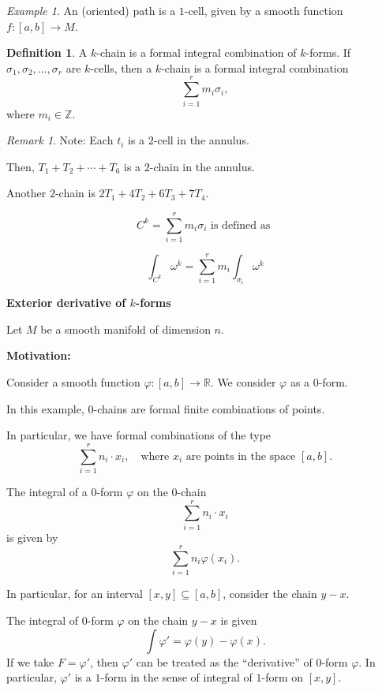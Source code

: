 \documentclass[11pt]{article}
\theoremstyle{definition}
\newtheorem{definition}{Definition}[section]
\theoremstyle{remark}
\newtheorem{remark}{Remark}[section]
\newtheorem{example}{Example}[section]
\begin{document}
\begin{example}\label{ex:oriented-path}
An (oriented) path is a $1$-cell, given by a smooth function $f: [a, b] \to M$.
\end{example}

\begin{definition}\label{def:k-chain}
A $k$-chain is a formal integral combination of $k$-forms. If $\sigma_1, \sigma_2, \dots, \sigma_r$ are $k$-cells, then a $k$-chain is a formal integral combination
\[
\sum_{i=1}^r m_i \sigma_i,
\]
where $m_i \in \mathbb{Z}$.
\end{definition}

\begin{remark}\label{rem:2-cell-annulus}
Note: Each $t_i$ is a $2$-cell in the annulus.
\end{remark}

Then, $T_1 + T_2 + \cdots + T_6$ is a $2$-chain in the annulus.

Another $2$-chain is $2T_1 + 4T_2 + 6T_3 + 7T_4$.

\[
C^k = \sum_{i=1}^r m_i \sigma_i \text{ is defined as }
\]

\[
\int_{C^k} \omega^k = \sum_{i=1}^r m_i \int_{\sigma_i} \omega^k
\]

\textbf{Exterior derivative of $k$-forms}

Let $M$ be a smooth manifold of dimension $n$.

\textbf{Motivation:}

Consider a smooth function $\varphi \colon [a,b] \to \mathbb{R}$. We consider $\varphi$ as a $0$-form.

In this example, $0$-chains are formal finite combinations of points.

In particular, we have formal combinations of the type
\[
\sum_{i=1}^r n_i \cdot x_i, \quad \text{where } x_i \text{ are points in the space } [a,b].
\]

The integral of a $0$-form $\varphi$ on the $0$-chain
\[
\sum_{i=1}^r n_i \cdot x_i
\]
is given by
\[
\sum_{i=1}^r n_i \varphi(x_i).
\]

In particular, for an interval $[x,y] \subseteq [a,b]$, consider the chain $y - x$.

The integral of $0$-form $\varphi$ on the chain $y - x$ is given
\[
\int \varphi' = \varphi(y) - \varphi(x).
\]
If we take $F = \varphi'$, then $\varphi'$ can be treated as the ``derivative'' of $0$-form $\varphi$. In particular, $\varphi'$ is a $1$-form in the sense of integral of $1$-form on $[x, y]$.
\end{document}
